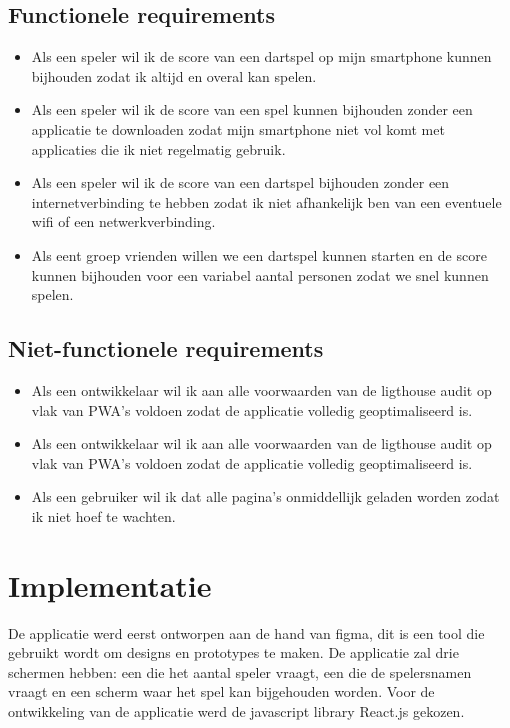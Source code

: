 	\subsection{Functionele requirements}
		\begin{itemize}
			 \item 	Als een speler wil ik de score van een dartspel op mijn smartphone kunnen bijhouden zodat ik altijd en overal kan spelen.
			 \item 	Als een speler wil ik de score van een spel kunnen bijhouden zonder een applicatie te downloaden zodat mijn smartphone niet vol komt met applicaties die ik niet regelmatig gebruik.
			 \item 	Als een speler wil ik de score van een dartspel bijhouden zonder een internetverbinding te hebben zodat ik niet afhankelijk ben van een eventuele wifi of een netwerkverbinding.
			 \item 	Als eent groep vrienden willen we een dartspel kunnen starten en de score kunnen bijhouden voor een variabel aantal personen zodat we snel kunnen spelen.
		\end{itemize}	
	
	\subsection{Niet-functionele requirements}
		\begin{itemize}
			 \item Als een ontwikkelaar wil ik aan alle voorwaarden van de ligthouse audit op vlak van PWA's voldoen zodat de applicatie volledig geoptimaliseerd is.
			 \item Als een ontwikkelaar wil ik aan alle voorwaarden van de ligthouse audit op vlak van PWA's voldoen zodat de applicatie volledig geoptimaliseerd is.
			 \item Als een gebruiker wil ik dat alle pagina's onmiddellijk geladen worden zodat ik niet hoef te wachten.
		\end{itemize}	


\section{Implementatie}

	De applicatie werd eerst ontworpen aan de hand van figma, dit is een tool die gebruikt wordt om designs en prototypes te maken. De applicatie zal drie schermen hebben: een die het aantal speler vraagt, een die de spelersnamen vraagt en een scherm waar het spel kan bijgehouden worden. 
	Voor de ontwikkeling van de applicatie werd de javascript library React.js gekozen.

